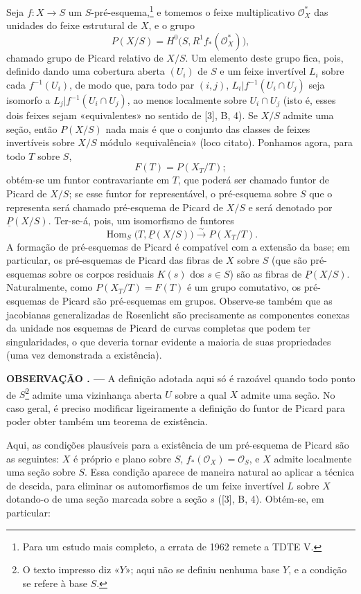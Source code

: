 \documentclass[11pt,twoside,openany]{book}
\numberwithin{equation}{section}
\theoremstyle{plain}
\theoremstyle{definition}
\theoremstyle{remark}
\newcommand{\result}[2]{%
  \par\medskip\noindent\textbf{#1%
  \if\relax\detokenize{#2}\relax\else\space#2\fi. ---}\enspace
}
\begin{document}
Seja $f:X\longrightarrow S$ um $S$-pré-esquema,\footnote{Para um estudo mais
completo, a errata de 1962 remete a TDTE V.} e tomemos o feixe
multiplicativo $\mathcal O_X^*$ das unidades do feixe estrutural de $X$, e
o grupo
\[
  P(X/S)=H^0\bigl(S,R^1f_*(\mathcal O_X^*)\bigr),
\]
chamado grupo de Picard relativo de $X/S$. Um elemento deste grupo fica,
pois, definido dando uma cobertura aberta $(U_i)$ de $S$ e um feixe invertível
$L_i$ sobre cada $f^{-1}(U_i)$, de modo que, para todo par $(i,j)$,
$L_i|f^{-1}(U_i\cap U_j)$ seja isomorfo a $L_j|f^{-1}(U_i\cap U_j)$, ao menos
localmente sobre $U_i\cap U_j$ (isto é, esses dois feixes sejam «equivalentes»
no sentido de [3], B, 4). Se $X/S$ admite uma seção, então $P(X/S)$ nada mais
é que o conjunto das classes de feixes invertíveis sobre $X/S$ módulo
«equivalência» (loco citato). Ponhamos agora, para todo $T$ sobre $S$,
\[
  F(T)=P(X_T/T) ;
\]
obtém-se um funtor contravariante em $T$, que poderá ser chamado funtor de Picard de
$X/S$; se esse funtor for representável, o pré-esquema sobre $S$ que o
representa será chamado pré-esquema de Picard de $X/S$ e será denotado por
$\underline P(X/S)$. Ter-se-á, pois, um isomorfismo de funtores
\[
  \operatorname{Hom}_S\bigl(T,\underline P(X/S)\bigr)
  \xrightarrow{\sim}P(X_T/T).
\]
A formação de pré-esquemas de Picard é compatível com a extensão da
base; em particular, os pré-esquemas de Picard das fibras de $X$ sobre $S$
(que são pré-esquemas sobre os corpos residuais $K(s)$ dos $s\in S$) são
as fibras de $\underline P(X/S)$. Naturalmente, como $P(X_T/T)=F(T)$ é um
grupo comutativo, os pré-esquemas de Picard são pré-esquemas em grupos.
Observe-se também que as jacobianas generalizadas de Rosenlicht são precisamente
as componentes conexas da unidade nos esquemas de Picard de curvas
completas que podem ter singularidades, o que deveria tornar evidente a
maioria de suas propriedades (uma vez demonstrada a existência).

\result{OBSERVAÇÃO}{} A definição adotada aqui só é razoável quando
todo ponto de $S$\footnote{O texto impresso diz «$Y$»; aqui não se definiu
nenhuma base $Y$, e a condição se refere à base $S$.} admite uma vizinhança
aberta $U$ sobre a qual $X$ admite uma seção. No caso geral, é preciso
modificar ligeiramente a definição do funtor de Picard para poder obter
também um teorema de existência.

Aqui, as condições plausíveis para a existência de um pré-esquema de Picard
são as seguintes: $X$ é próprio e plano sobre $S$,
$f_*(\mathcal O_X)=\mathcal O_S$, e $X$ admite localmente uma seção sobre
$S$. Essa condição aparece de maneira natural ao aplicar a técnica de
descida, para eliminar os automorfismos de um feixe invertível $L$ sobre $X$
dotando-o de uma seção marcada sobre a seção $s$ ([3], B, 4). Obtém-se,
em particular:
\end{document}

